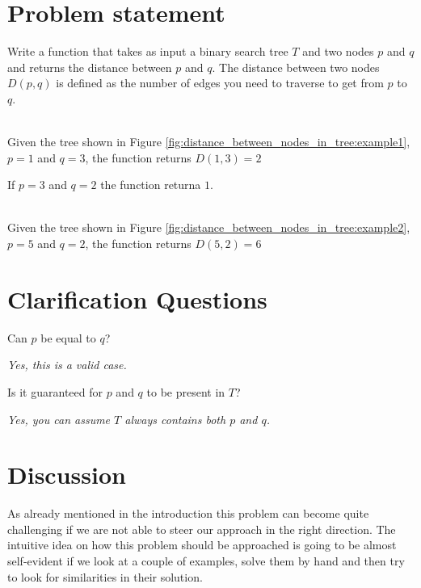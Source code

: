 \section{Problem statement}
\label{sec:distance_between_nodes_in_tree:problem}
\begin{exercise}
	Write a function that takes as input a binary search tree $T$ and two nodes $p$ and $q$ and
	returns the distance between $p$ and $q$. The distance between two nodes $D(p,q)$ is defined as
	the number of edges you need to traverse to get from $p$ to $q$.
	
	\begin{example}
		\hfill \\
		Given the tree shown in Figure \ref{fig:distance_between_nodes_in_tree:example1}, $p = 1$
		and $q=3$, the function returns $D(1,3)=2$ 
		
		If $p=3$ and $q=2$ the function returna $1$.
	\label{ex:distance_between_nodes_in_tree:example1}
	\end{example}

	\begin{example}
		\hfill \\
		Given the tree shown in Figure \ref{fig:distance_between_nodes_in_tree:example2}, $p = 5$
		and $q=2$, the function returns $D(5,2)=6$ 
		\label{ex:distance_between_nodes_in_tree:example2}
	\end{example}
\end{exercise}

\section{Clarification Questions}

\begin{QandA}
	\item Can $p$ be equal to $q$?
	\begin{answered}
		\textit{Yes, this is a valid case.}
	\end{answered}
	
	\item Is it guaranteed for  $p$ and  $q$ to be present in $T$?
	\begin{answered}
		\textit{Yes, you can assume $T$ always contains both $p$ and $q$.}
	\end{answered}

\end{QandA}

\section{Discussion}
\label{distance_between_nodes_in_tree:sec:discussion}
As already mentioned in the introduction this problem can become quite challenging if we are not
able to steer our approach in the right direction. The intuitive idea on how this problem should be
approached is going to be almost self-evident if we look at a couple of examples, solve them by hand
and then try to look for similarities in their solution.

